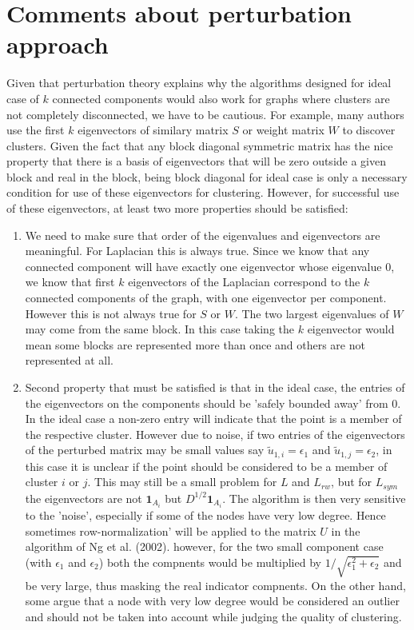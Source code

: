 \documentclass[10pt,a4paper, nocenter]{report}
\begin{document}
	\section{Comments about perturbation approach}
	Given that perturbation theory explains why the algorithms designed for ideal case of $k$ connected components would also work for graphs where clusters are not completely disconnected, we have to be cautious. For example, many authors use the first $k$ eigenvectors of similary matrix $S$ or weight matrix $W$ to discover clusters. Given the fact that any block diagonal symmetric matrix has the nice property that there is a basis of eigenvectors that will be zero outside a given block and real in the block, being block diagonal for ideal case is only a necessary condition for use of these eigenvectors for clustering. However, for successful use of these eigenvectors, at least two more properties should be satisfied:
	\begin{enumerate}
		\item We need to make sure that order of the eigenvalues and eigenvectors are meaningful. For Laplacian this is always true. Since we know that any connected component will have exactly one eigenvector whose eigenvalue $0$, we know that first $k$ eigenvectors of the Laplacian correspond to the $k$ connected components of the graph, with one eigenvector per component. However this is not always true for $S$ or $W$. The two largest eigenvalues of $W$ may come from the same block. In this case taking the $k$ eigenvector would mean some blocks are represented more than once and others are not represented at all.
		
		\item Second property that must be satisfied is that in the ideal case, the entries of the eigenvectors on the components should be 'safely bounded away' from 0. In the ideal case a non-zero entry will indicate that the point is a member of the respective cluster. However due to noise, if two entries of the eigenvectors of the perturbed matrix may be small values say $\tilde{u}_{1,i}=\epsilon_{1}$ and $\tilde{u}_{1,j}=\epsilon_{2}$, in this case it is unclear if the point should be considered to be a member of cluster $i$ or $j$. This may still be a small problem for $L$ and $L_{rw}$, but for $L_{sym}$ the eigenvectors are not $\mathbf{1}_{A_{i}}$ but $D^{1/2}\mathbf{1}_{A_{i}}$. The algorithm is then very sensitive to the 'noise', especially if some of the nodes have very low degree. Hence sometimes row-normalization' will be applied to the matrix $U$ in the algorithm of Ng et al. (2002). however, for the two small component case (with $\epsilon_{1}$ and $\epsilon_{2}$) both the compnents would be multiplied by $1/\sqrt{\epsilon_{1}^{2}+\epsilon_{2}}$ and be very large, thus masking the real indicator compnents. On the other hand, some argue that a node with very low degree would be considered an outlier and should not be taken into account while judging the quality of clustering. 
	\end{enumerate}
\end{document}
